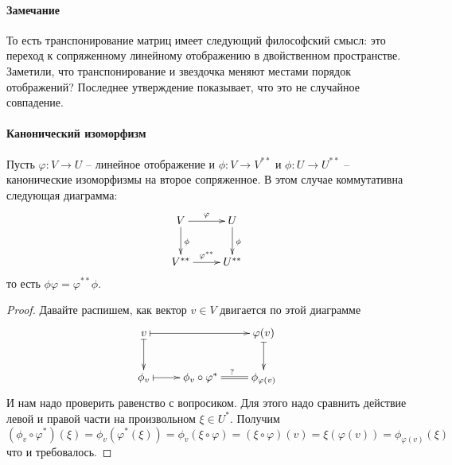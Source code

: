 \paragraph{Замечание}

То есть транспонирование матриц имеет следующий философский смысл: это переход к сопряженному линейному отображению в двойственном пространстве. Заметили, что транспонирование и звездочка меняют местами порядок отображений? Последнее утверждение показывает, что это не случайное совпадение.

\paragraph{Канонический изоморфизм}

\begin{claim}\label{claim::CanonicalIsomorphism}
Пусть $\varphi\colon V\to U$ -- линейное отображение и $\phi\colon V\to V^{**}$ и $\phi\colon U\to U^{**}$ -- канонические изоморфизмы на второе сопряженное. В этом случае коммутативна следующая диаграмма:
\[
\xymatrix{
	{V}\ar[r]^{\varphi}\ar[d]^{\phi}&{U}\ar[d]^{\phi}\\
	{V^{**}}\ar[r]^{\varphi^{**}}&{U^{**}}
}
\]
то есть $\phi \varphi = \varphi^{**}\phi$.
\end{claim}
\begin{proof}
Давайте распишем, как вектор $v\in V$ двигается по этой диаграмме
\[
\xymatrix{
	{v}\ar@{|->}[rr]\ar@{|->}[d]&{}&{\varphi(v)}\ar@{|->}[d]\\
	{\phi_v}\ar@{|->}[r]&{\phi_v\circ \varphi^*}\ar@{=}[r]^{?}&{\phi_{\varphi(v)}}
}
\]
И нам надо проверить равенство с вопросиком. Для этого надо сравнить действие левой и правой части на произвольном $\xi\in U^*$. Получим
\[
(\phi_v\circ \varphi^*)(\xi) = \phi_v(\varphi^*(\xi)) = \phi_v(\xi\circ\varphi) = (\xi\circ \varphi) (v) = \xi(\varphi(v)) = \phi_{\varphi(v)}(\xi)
\]
что и требовалось.
\end{proof}

